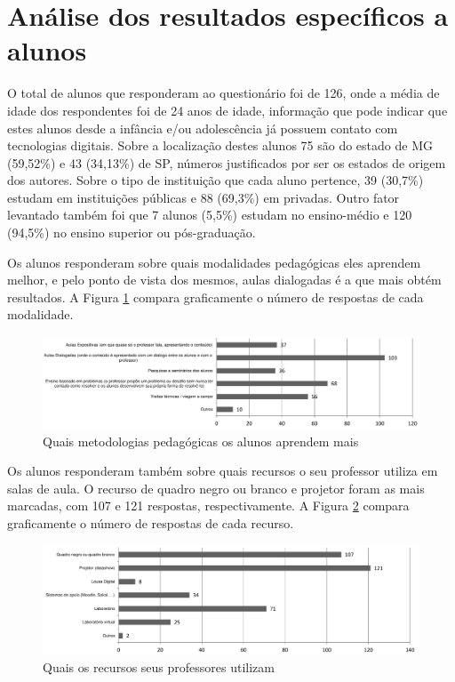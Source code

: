 \section{Análise dos resultados específicos a alunos}

O total de alunos que responderam ao questionário foi de 126, onde a média de idade dos respondentes foi de 24 anos de idade, informação que pode indicar que estes alunos desde a infância e/ou adolescência já possuem contato com tecnologias digitais. Sobre a localização destes alunos 75 são do estado de MG (59,52\%) e 43 (34,13\%) de SP, números justificados por ser os estados de origem dos autores. Sobre o tipo de instituição que cada aluno pertence, 39 (30,7\%) estudam em instituições públicas e 88 (69,3\%) em privadas. Outro fator levantado também foi que 7 alunos (5,5\%) estudam no ensino-médio e 120 (94,5\%) no ensino superior ou pós-graduação.

Os alunos responderam sobre quais modalidades pedagógicas eles aprendem melhor, e pelo ponto de vista dos mesmos, aulas dialogadas é a que mais obtém resultados. A Figura \ref{fig:metodologia_alunos} compara graficamente o número de respostas de cada modalidade.

\begin{figure}[!h]
\centering
\includegraphics[width=1.0\textwidth]{pdfs/alunos-professores/pesquisa-alunos-modalidade-pedagogicas.pdf} 
\caption{Quais metodologias pedagógicas os alunos aprendem mais}
\label{fig:metodologia_alunos} 
\end{figure}

Os alunos responderam também sobre quais recursos o seu professor utiliza em salas de aula. O recurso de quadro negro ou branco e projetor foram as mais marcadas, com 107 e 121 respostas, respectivamente. A Figura \ref{fig:recursos_professores} compara graficamente o número de respostas de cada recurso.

\begin{figure}[!h]
\centering
\includegraphics[width=1.0\textwidth]{pdfs/alunos-professores/pesquisa-alunos-recursos-que-seu-professor.pdf} 
\caption{Quais os recursos seus professores utilizam}
\label{fig:recursos_professores} 
\end{figure}

